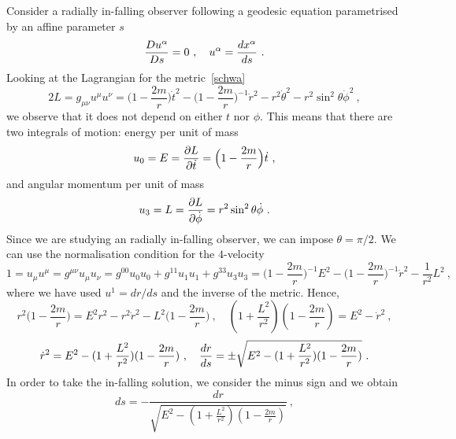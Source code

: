     Consider a radially in-falling observer following a geodesic equation parametrised by an affine parameter $s$ 
    \begin{equation*}
        \frac{Du^\alpha}{Ds} = 0 ~, \quad u^\alpha = \frac{dx^\alpha}{ds}  ~.
    \end{equation*}
    Looking at the Lagrangian for the metric~\eqref{schwa}
    \begin{equation*} 
        2 L = g_{\mu\nu} u^\mu u^\nu = \Big ( 1 - \frac{2m}{r} \Big ) \dot t^2 - \Big ( 1 - \frac{2m}{r} \Big)^{-1} \dot r^2 - r^2 \dot \theta^2 - r^2 \sin^2 \theta \dot \phi^2 ~,
    \end{equation*}
    we observe that it does not depend on either $t$ nor $\phi$. This means that there are two integrals of motion: energy per unit of mass 
    \begin{equation}\label{en}
        u_0 = E = \frac{\partial L}{\partial\dot t} = \Big ( 1 - \frac{2m}{r} \Big ) \dot t ~,
    \end{equation}
    and angular momentum per unit of mass 
    \begin{equation*}
        u_3 = L = \frac{\partial L}{\partial\dot \phi} = r^2 \sin^2 \theta \dot \phi ~.
    \end{equation*}
    Since we are studying an radially in-falling observer, we can impose $\theta = \pi/2$. We can use the normalisation condition for the $4$-velocity 
    \begin{equation*}
        1 = u_\mu u^\mu = g^{\mu\nu} u_\mu u_\nu = g^{00} u_0 u_0 + g^{11} u_1 u_1 + g^{33} u_3 u_3 = \Big(1 - \frac{2m}{r} \Big )^{-1} E^2 - \Big(1 - \frac{2m}{r} \Big )^{-1} \dot r^2 - \frac{1}{r^2} L^2 ~,
    \end{equation*}
    where we have used $u^1 = dr / ds$ and the inverse of the metric. Hence, 
    \begin{equation*}
        r^2 \Big(1 - \frac{2m}{r} \Big ) = E^2 r^2 - r^2 \dot r^2 - L^2 \Big(1 - \frac{2m}{r} \Big ) ~, \quad (1 + \frac{L^2}{r^2}) (1 - \frac{2m}{r} ) = E^2 - \dot r^2 ~,
    \end{equation*}
    \begin{equation}\label{rdot}
        \dot r^2 = E^2 - (1 + \frac{L^2}{r^2}) (1 - \frac{2m}{r} ) ~, \quad \frac{dr}{ds} = \pm \sqrt{E^2 - (1 + \frac{L^2}{r^2}) (1 - \frac{2m}{r} )} ~.
    \end{equation}
    In order to take the in-falling solution, we consider the minus sign and we obtain 
    \begin{equation*}
        ds = - \frac{dr}{\sqrt{E^2 - (1 + \frac{L^2}{r^2}) (1 - \frac{2m}{r}  )}} ~,
    \end{equation*}

